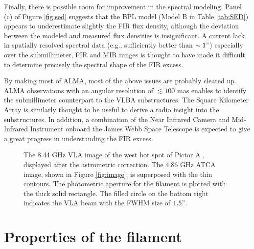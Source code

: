 \documentclass[twocolumn]{aastex631}
\begin{document}
Finally, 
there is possible room for improvement in the spectral modeling.
Panel (c) of Figure \ref{fig:sed} suggests that
the BPL model (Model B in Table \ref{tab:SED}) appears 
to underestimate slightly the FIR flux density,
although the deviation between the modeled and measured
flux densities is insignificant.
A current lack in spatially resolved spectral data 
(e.g., sufficiently better than $\sim 1"$)
especially over the submillimeter, FIR and MIR ranges 
is thought to have made it difficult to determine 
precisely the spectral shape of the FIR excess.

By making most of ALMA,
most of the above issues are probably cleared up.
ALMA observations with an angular resolution of $\lesssim 100$ mas
enables to identify the submillimeter counterpart to the VLBA substructures. 
The Square Kilometer Array is similarly thought to be useful 
to derive a radio insight into the substructures.
In addition, a combination of the Near Infrared Camera and 
Mid-Infrared Instrument %
onboard the James Webb Space Telescope is expected 
to give a great progress in understanding the FIR excess.


\begin{figure}[t]
    \caption{
    The 8.44 GHz VLA image of the west hot spot of Pictor A \citep{perley1997}, 
    displayed after the astrometric correction.
    The 4.86 GHz ATCA image, 
    shown in Figure \ref{fig:image},
    is superposed with the thin contours. 
    The photometric aperture for the filament is plotted with 
    the thick solid rectangle. 
    The filled circle on the bottom right indicates 
    the VLA beam with the FWHM size of $1.5"$.
    }
    \label{fig:img_fil}
\end{figure}


\section{Properties of the filament}
\label{sec:filament}
\end{document}
